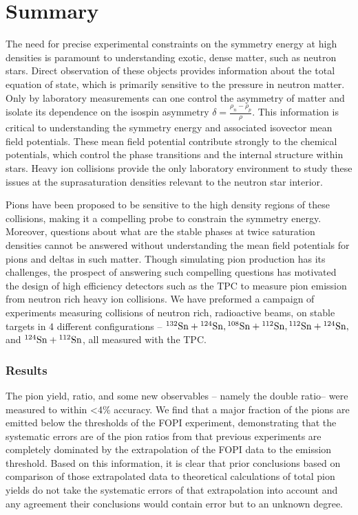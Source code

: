 \chapter{Summary}
\label{chap:summary}

The need for precise experimental constraints on the symmetry energy at high densities is paramount to understanding exotic, dense matter, such as neutron stars. Direct observation of these objects provides information about the total equation of state, which is primarily sensitive to the pressure in neutron matter. Only by laboratory measurements can one control the asymmetry of matter and isolate its dependence on the isospin asymmetry $\delta = \frac{\rho_n - \rho_p}{\rho}$. This information is critical to understanding the symmetry energy and associated isovector mean field potentials. These mean field potential contribute strongly to the chemical potentials, which control the phase transitions and the internal structure within stars. Heavy ion collisions provide the only laboratory environment to study these issues at the suprasaturation densities relevant to the neutron star interior.  

Pions have been proposed to be sensitive to the high density regions of these collisions, making it a compelling probe to constrain the symmetry energy. Moreover, questions about what are the stable phases at twice saturation densities cannot be answered without understanding the mean field potentials for pions and deltas in such matter. Though simulating pion production has its challenges, the prospect of answering such compelling questions has motivated the design of high efficiency detectors such as the \spirit TPC to measure pion emission from neutron rich heavy ion collisions. We have preformed a campaign of experiments measuring collisions of neutron rich, radioactive beams, on stable targets in 4 different configurations -- ${}^{132}\mathrm{Sn} + {}^{124}\mathrm{Sn}, {}^{108}\mathrm{Sn} + {}^{112}\mathrm{Sn}, {}^{112}\mathrm{Sn} + {}^{124}\mathrm{Sn},$ and ${}^{124}\mathrm{Sn} + {}^{112}\mathrm{Sn}$, all measured with the \spirit TPC. 

\subsection{Results}
The pion yield, ratio, and some new observables -- namely the double ratio-- were measured to within <4\% accuracy. We find that a major fraction of the pions are emitted below the thresholds of the FOPI experiment, demonstrating that the systematic errors are of the pion ratios from that previous experiments are completely dominated by the extrapolation of the FOPI data to the emission threshold. Based on this information, it is clear that prior conclusions based on comparison of those extrapolated data to theoretical calculations of total pion yields do not take the systematic errors of that extrapolation into account and any agreement their conclusions would contain error but to an unknown degree. 

